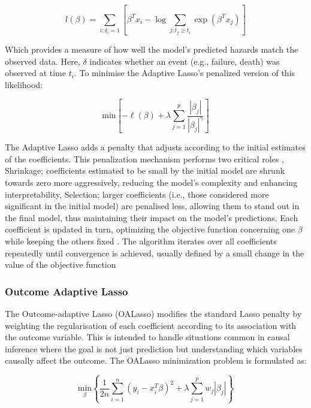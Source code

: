 \begin{equation} \label{eq:likelihood}l(\beta) = \sum_{i:\delta_{i}=1} \left[ \beta^{T}x_{i} - \log{\sum_{j:t_{j}\ge t_{i}} \exp(\beta^{T}x_{j})} \right]\end{equation}

\noindent Which provides a measure of how well the model's predicted hazards match the observed data. Here, \(\delta\) indicates whether an event (e.g., failure, death) was observed at time \(t_{i}\). To minimise the Adaptive Lasso's penalized version of this likelihood:

\begin{equation} \label{eq:adaptlasso}
\text{min}\left[ -\ell(\beta) + \lambda \sum_{j=1}^{p} \frac{|\beta_j|}{|\beta_j|^\gamma} \right]
\end{equation}

\noindent The Adaptive Lasso adds a penalty that adjusts according to the initial estimates of the coefficients. This penalization mechanism performs two critical roles \parencite{zhang_adaptive_2007}, Shrinkage; coefficients estimated to be small by the initial model are shrunk towards zero more aggressively, reducing the model's complexity and enhancing interpretability, Selection; larger coefficients (i.e., those considered more significant in the initial model) are penalised less, allowing them to stand out in the final model, thus maintaining their impact on the model's predictions. Each coefficient is updated in turn, optimizing the objective function concerning one \(\beta\) while keeping the others fixed \parencite{zhang_adaptive_2007}. The algorithm iterates over all coefficients repeatedly until convergence is achieved, usually defined by a small change in the value of the objective function

\subsubsection{Outcome Adaptive Lasso}
\noindent The Outcome-adaptive Lasso (OALasso) \parencite{shortreed_outcome-adaptive_2017} modifies the standard Lasso penalty by weighting the regularisation of each coefficient according to its association with the outcome variable. This is intended to handle situations common in causal inference where the goal is not just prediction but understanding which variables causally affect the outcome. The OALasso minimization \parencite{shortreed_outcome-adaptive_2017} problem is formulated as:

\begin{equation} \label{eq:oalasso}\underset{\beta}{\text{min}} \left\{ \frac{1}{2n} \sum_{i=1}^{n}(y_{i}-x_{i}^{T}\beta)^{2} + \lambda \sum_{j=1}^{p}w_{j}|\beta_{j}|\right\}\end{equation}

